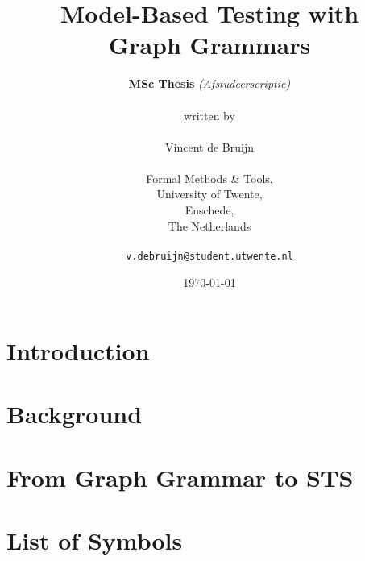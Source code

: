 \documentclass[a4paper]{report}
\def\listofsymbols{ \clearpage}
\theoremstyle{definition}
\begin{document}
  \title{\textbf{Model-Based Testing with\\Graph Grammars}}
  \author{\textbf{MSc Thesis} \textit{(Afstudeerscriptie)}\\
  \\
  written by
  \\
  \\
  Vincent de Bruijn\\
  \\
  Formal Methods \& Tools,\\
  University of Twente,
  \\Enschede,\\
  The Netherlands\\
  \\
  \texttt{v.debruijn@student.utwente.nl}}
  \date{\today}
  \maketitle
  
  
  
  \newpage
  \tableofcontents
  \newpage

  \newpage
  \chapter{Introduction}\label{chapter:introduction}
  
  
  
  \newpage
  \chapter{Background}\label{chapter:background}
  
  
  
  
  
  
  

  \newpage
  \chapter{From Graph Grammar to STS}\label{chapter:gg_to_sts}
  
  
  
  \newpage
  {}
  
  \newpage
  \chapter*{List of Symbols\hfill} 
\listofsymbols
\end{document}
